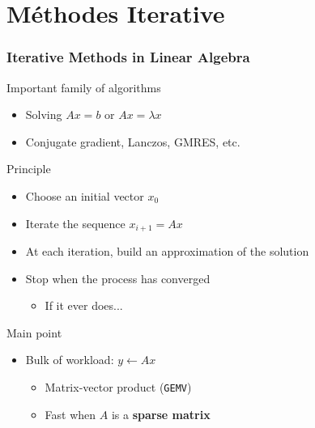 \documentclass[xcolor={x11names,svgnames},x11names,svgnames]{beamer}
\newcommand{\red}{\alert}
\begin{document}
\section{Méthodes Iterative}


\begin{frame}
  \frametitle{Iterative Methods in Linear Algebra}

  Important family of algorithms
  \begin{itemize}
  \item Solving $Ax = b$ or $Ax = \lambda x$
  \item Conjugate gradient, Lanczos, GMRES, etc.
  \end{itemize}

  \begin{block}{Principle}
    \begin{itemize}
    \item Choose an initial vector $x_0$
    \item Iterate the sequence $x_{i+1} = Ax$
    \item At each iteration, build an approximation of the solution
    \item Stop when the process has converged
      \begin{itemize}
      \item If it ever does...
      \end{itemize}
    \end{itemize}    
  \end{block}

  \begin{exampleblock}{Main point}
    
    \begin{itemize}
    \item Bulk of workload: \red{$y \gets Ax$}
      \begin{itemize}
      \item Matrix-vector product (\texttt{GEMV})
      \item Fast when $A$ is a \alert{\textbf{sparse matrix}}
      \end{itemize}
    \end{itemize}
  \end{exampleblock}  
\end{frame}

\end{document}
